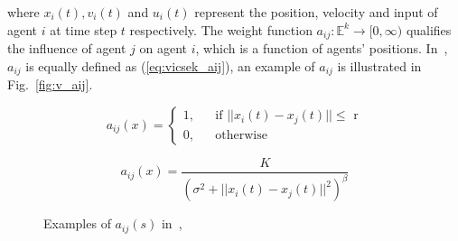 \noindent
where $x_i(t), v_i(t)$ and $u_i(t)$ represent the position, velocity and input of agent $i$ at time step $t$ respectively. The weight function $a_{ij}:\mathbb{E}^k\to[0,\infty)$ qualifies the influence of agent $j$ on agent $i$, which is a function of agents' positions. In~\cite{Vicsek1995}, $a_{ij}$ is equally defined as (\ref{eq:vicsek_aij}), an example of $a_{ij}$ is illustrated in Fig.~\ref{fig:v_aij}.

\begin{equation}\label{eq:vicsek_aij}
a_{ij}(x)=\left\{\begin{array}{rcl}
1, & & \text{if $||x_i(t)-x_j(t)||\leq$ r}\\
0, & & \text{otherwise}
\end{array} \right.
\end{equation}

\begin{equation}\label{eq:cs_aij}
a_{ij}(x)=\frac{K}{(\sigma^2+||x_i(t)-x_j(t)||^2)^{\beta}}
\end{equation}

\begin{figure}[htb]
  \centering
  \caption{Examples of $a_{ij}(s)$ in~\cite{Vicsek1995},~\cite{CuckerSmale2007}}\label{fig:example_v}
\end{figure}

